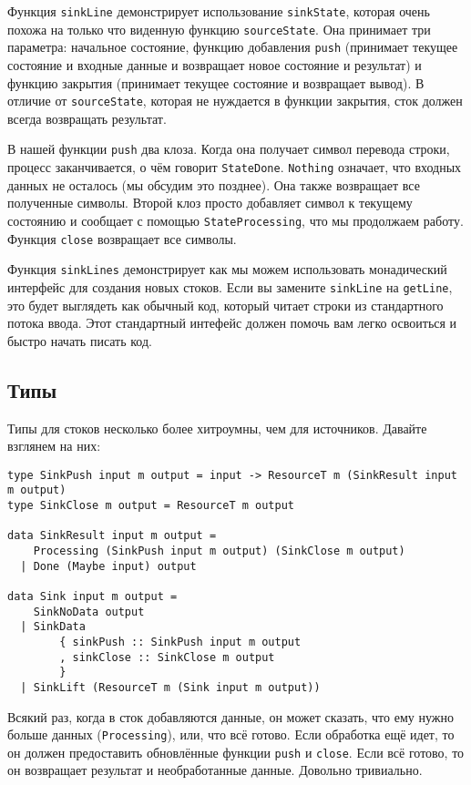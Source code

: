 Функция \lstinline=sinkLine= демонстрирует использование \lstinline=sinkState=, которая
очень похожа на только что
виденную функцию \lstinline=sourceState=. Она принимает три параметра: начальное
состояние,
функцию добавления \verb=push= 
(принимает текущее состояние и входные данные и возвращает новое состояние и результат)
и функцию закрытия (принимает текущее состояние и возвращает вывод).
В отличие от \lstinline=sourceState=, которая не нуждается в функции закрытия, сток
должен всегда возвращать результат.

В нашей функции \lstinline=push= два клоза. Когда она получает символ перевода строки,
процесс заканчивается, о чём говорит \lstinline=StateDone=. \lstinline=Nothing= означает,
что
входных данных не
осталось (мы обсудим это позднее). Она также возвращает все полученные символы. Второй
клоз просто добавляет символ к текущему состоянию и сообщает с помощью
\lstinline=StateProcessing=, что мы продолжаем работу.
Функция \lstinline=close= возвращает все символы.

Функция \lstinline=sinkLines= демонстрирует как мы можем использовать монадический
интерфейс для создания новых стоков. Если вы замените \lstinline=sinkLine= на
\lstinline=getLine=, это будет выглядеть
как обычный код, который читает строки из стандартного потока ввода. Этот
стандартный интефейс должен помочь вам легко освоиться и быстро начать писать код.

\subsection{Типы}

Типы для стоков несколько более хитроумны, чем для источников. Давайте взглянем на них:
\begin{lstlisting}
type SinkPush input m output = input -> ResourceT m (SinkResult input m output)
type SinkClose m output = ResourceT m output

data SinkResult input m output =
    Processing (SinkPush input m output) (SinkClose m output)
  | Done (Maybe input) output

data Sink input m output =
    SinkNoData output
  | SinkData
        { sinkPush :: SinkPush input m output
        , sinkClose :: SinkClose m output
        }
  | SinkLift (ResourceT m (Sink input m output))
\end{lstlisting}  
Всякий раз, когда в сток добавляются данные, он может сказать, что ему нужно больше
данных (\lstinline{Processing}), или, что всё готово. Если обработка ещё идет, то он должен предоставить
обновлённые функции \lstinline{push} и \lstinline{close}. Если всё готово, то он возвращает результат и
необработанные данные. Довольно тривиально.
 
